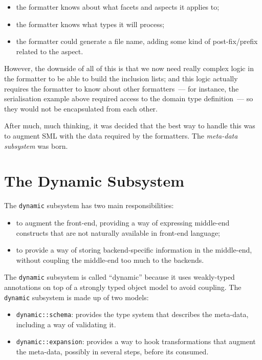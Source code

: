 \documentclass{book}
\begin{document}
\begin{itemize}
\item the formatter knows about what facets and aspects it applies to;
\item the formatter knows what types it will process;
\item the formatter could generate a file name, adding some kind of
  post-fix/prefix related to the aspect.
\end{itemize}

However, the downside of all of this is that we now need really
complex logic in the formatter to be able to build the inclusion
lists; and this logic actually requires the formatter to know about
other formatters~--- for instance, the serialisation example above
required access to the domain type definition~--- so they would not be
encapsulated from each other.

After much, much thinking, it was decided that the best way to handle
this was to augment SML with the data required by the formatters. The
\emph{meta-data subsystem} was born.

\chapter{The Dynamic Subsystem}

The \texttt{dynamic} subsystem has two main responsibilities:

\begin{itemize}
\item to augment the front-end, providing a way of expressing
  middle-end constructs that are not naturally available in front-end
  language;
\item to provide a way of storing backend-specific information in the
  middle-end, without coupling the middle-end too much to the
  backends.
\end{itemize}

The \texttt{dynamic} subsystem is called ``dynamic'' because it uses
weakly-typed annotations on top of a strongly typed object model to
avoid coupling. The \texttt{dynamic} subsystem is made up of two
models:

\begin{itemize}
\item \texttt{dynamic::schema}: provides the type system that
  describes the meta-data, including a way of validating it.
\item \texttt{dynamic::expansion}: provides a way to hook
  transformations that augment the meta-data, possibly in several
  steps, before its consumed.
\end{itemize}
\end{document}
